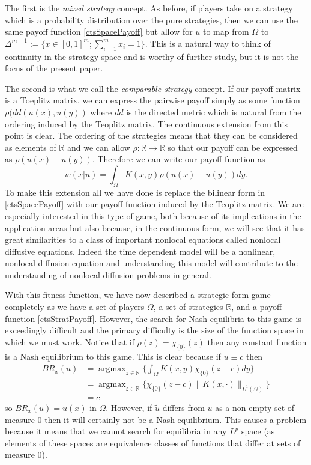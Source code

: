 \documentclass[aps,
preprint,
groupedaddress,
showkeys,
amsmath]{revtex4-2}
\DeclareMathOperator*{\argmax}{\text{argmax}}
\begin{document}
The first is the \textit{mixed strategy} concept. As before, if players take on a strategy which is a probability distribution over the pure strategies, then we can use the same payoff function \eqref{ctsSpacePayoff} but allow for $u$ to map from $\Omega $ to $\Delta^{m-1}:=\{x\in[0,1]^m;\sum_{i=1}^mx_i=1\}.$ This is a natural way to think of continuity in the strategy space and is worthy of further study, but it is not the focus of the present paper.

The second is what we call the \textit{comparable strategy} concept. If our payoff matrix is a Toeplitz matrix, we can express the pairwise payoff simply as some function $\rho(dd(u(x),u(y))$ where $dd$ is the directed metric which is natural from the ordering induced by the Teoplitz matrix.  The continuous extension from this point is clear. The ordering of the strategies means that they can be considered as elements of $\mathbb{R}$ and we can allow $\rho:\mathbb{R}\to \mathbb{R}$ so that our payoff can be expressed as $\rho(u(x)-u(y))$.  Therefore we can write our payoff function as 
\begin{equation}\label{ctsStratPayoff}
w(x|u)=\int_{\Omega}K(x,y)\rho(u(x)-u(y))dy.
\end{equation}
To make this extension all we have done is replace the bilinear form in \eqref{ctsSpacePayoff} with our payoff function induced by the Teoplitz matrix. We are especially interested in this type of game, both because of its implications in the application areas but also because, in the continuous form, we will see that it has great similarities to a class of important nonlocal equations called nonlocal diffusive equations. Indeed the time dependent model will be a nonlinear, nonlocal diffusion equation and understanding this model will contribute to the understanding of nonlocal diffusion problems in general.  

With this fitness function, we have now described a strategic form game completely as we have a set of players $\Omega$, a set of strategies $\mathbb{R}$, and a payoff function \eqref{ctsStratPayoff}. However, the search for Nash equilibria to this game is exceedingly difficult and the primary difficulty is the size of the function space in which we must work. Notice that if $\rho(z)=\chi_{\{0\}}(z)$ then any constant function is a Nash equilibrium to this game. This is clear because if $u\equiv c$ then 
\begin{equation*}
\begin{split} BR_x(u)&=\argmax_{z\in\mathbb{R}}\{\int_\Omega K(x,y)\chi_{\{0\}}(z-c)dy\}\\ 
    &=\argmax_{z\in\mathbb{R}}\{\chi_{\{0\}}(z-c)\|K(x,\cdot)\|_{L^1(\Omega)}\}\\
    &=c
    \end{split}
    \end{equation*}
    so $BR_x(u)=u(x)$ in $\Omega$. However, if $\tilde{u}$ differs from $u$ as a non-empty set of measure 0 then it will certainly not be a Nash equilibrium. This causes a problem because it means that we cannot search for equilibria in any $L^p$ space (as elements of these spaces are equivalence classes of functions that differ at sets of measure 0). 
\end{document}
